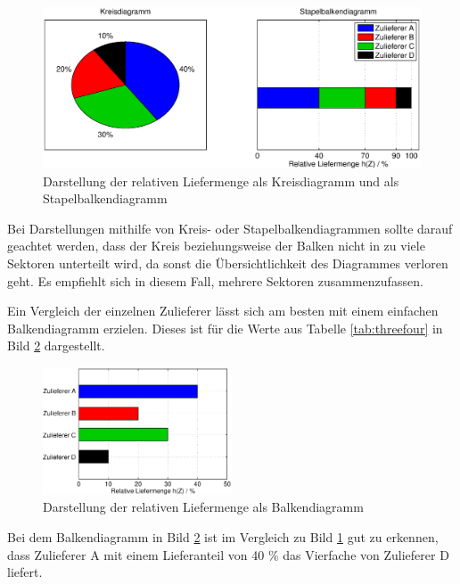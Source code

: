 \noindent 
\begin{figure}[H]
  \centerline{\includegraphics[width=1\textwidth]{Kapitel3/Bilder/image6}}
  \caption{Darstellung der relativen Liefermenge als Kreisdiagramm und als Stapelbalkendiagramm}
  \label{fig:Zuliefererbewertung1}
\end{figure}

\noindent Bei Darstellungen mithilfe von Kreis- oder Stapelbalkendiagrammen sollte darauf geachtet werden, dass der Kreis beziehungsweise der Balken nicht in zu viele Sektoren unterteilt wird, da sonst die \"{U}bersichtlichkeit des Diagrammes verloren geht. Es empfiehlt sich in diesem Fall, mehrere Sektoren zusammenzufassen. 

\noindent Ein Vergleich der einzelnen Zulieferer l\"{a}sst sich am besten mit einem einfachen Balkendiagramm erzielen. Dieses ist f\"{u}r die Werte aus Tabelle \ref{tab:threefour} in Bild \ref{fig:Zuliefererbewertung2} dargestellt.

\noindent 
\begin{figure}[H]
  \centerline{\includegraphics[width=0.5\textwidth]{Kapitel3/Bilder/image7}}
  \caption{Darstellung der relativen Liefermenge als Balkendiagramm}
  \label{fig:Zuliefererbewertung2}
\end{figure}

\noindent Bei dem Balkendiagramm in Bild \ref{fig:Zuliefererbewertung2} ist im Vergleich zu Bild \ref{fig:Zuliefererbewertung1} gut zu erkennen, dass Zulieferer A mit einem Lieferanteil von 40 \% das Vierfache von Zulieferer D liefert.

